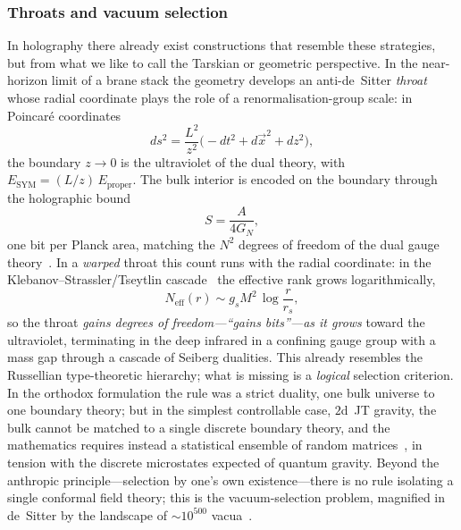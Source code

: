 \subsubsection{Throats and vacuum selection}
In holography there already exist constructions that resemble these strategies, but from what we like to call the
Tarskian or geometric perspective. In the near-horizon limit of a brane
stack the geometry develops an anti-de~Sitter \emph{throat}~\cite{Maldacena98} whose radial coordinate plays the
role of a renormalisation-group scale: in Poincar\'e coordinates
\begin{equation}
ds^{2}=\frac{L^{2}}{z^{2}}\bigl(-dt^{2}+d\vec{x}^{2}+dz^{2}\bigr),
\end{equation}
the boundary $z\to 0$ is the ultraviolet of the dual theory, with $E_{\mathrm{SYM}}=(L/z)\,E_{\mathrm{proper}}$. The
bulk interior is encoded on the boundary through the holographic bound
\begin{equation}
S=\frac{A}{4G_N},
\end{equation}
one bit per Planck area, matching the $N^{2}$ degrees of freedom of the dual gauge theory~\cite{SusskindWitten98}. In
a \emph{warped} throat this count runs with the radial coordinate: in the Klebanov--Strassler/Tseytlin
cascade~\cite{KT00,KS00} the effective rank grows logarithmically,
\begin{equation}
N_{\mathrm{eff}}(r)\sim g_s M^{2}\,\log\!\frac{r}{r_s},
\end{equation}
so the throat \emph{gains degrees of freedom---``gains bits''---as it grows} toward the ultraviolet, terminating in
the deep infrared in a confining gauge group with a mass gap through a cascade of Seiberg dualities. This already resembles the Russellian type-theoretic hierarchy; what is missing
is a \emph{logical} selection criterion. In the orthodox formulation the rule was a strict duality, one bulk
universe to one boundary theory; but in the simplest controllable case, $2$d~JT gravity, the bulk cannot be matched
to a single discrete boundary theory, and the mathematics requires instead a statistical ensemble of random
matrices~\cite{SSS19}, in tension with the discrete microstates expected of quantum gravity. Beyond the anthropic
principle---selection by one's own existence---there is no rule isolating a single conformal field theory; this is
the vacuum-selection problem, magnified in de~Sitter by the landscape of $\sim 10^{500}$ vacua~\cite{Susskind03}.

